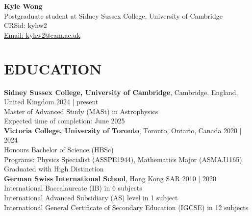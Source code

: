 \documentclass[a4paper,10pt]{extarticle}
\begin{document}
\pagestyle{fancy}
\renewcommand{\headrulewidth}{0pt}
\fancyhead{}
\fancyhead[R]{\textit{\monthyeardate\today}}
\thispagestyle{empty} %

\begin{flushleft}
\textbf{\LARGE Kyle Wong}\\[2pt] %
Postgraduate student at Sidney Sussex College, University of Cambridge
\\ {CRSid: kyhw2} \\
\href{mailto:kyleyh.wong@mail.utoronto.ca}{Email: kyhw2@cam.ac.uk} %
\end{flushleft}

\section*{EDUCATION}
\textbf{Sidney Sussex College, University of Cambridge}, Cambridge, England, United Kingdom \hfill 2024 | present\\
Master of Advanced Study (MASt) in Astrophysics\\
Expected time of completion: June 2025\\



\textbf{Victoria College, University of Toronto}, Toronto, Ontario, Canada \hfill 2020 | 2024\\ %
Honours Bachelor of Science (HBSc)\\
Programs: Physics Specialist (ASSPE1944), Mathematics Major (ASMAJ1165)\\ 
Graduated with High Distinction\\


\textbf{German Swiss International School}, Hong Kong SAR \hfill 2010 | 2020\\ %
International Baccalaureate (IB) in 6 subjects\\
International Advanced Subsidiary (AS) level in 1 subject\\
International General Certificate of Secondary Education (IGCSE) in 12 subjects

\end{document}
